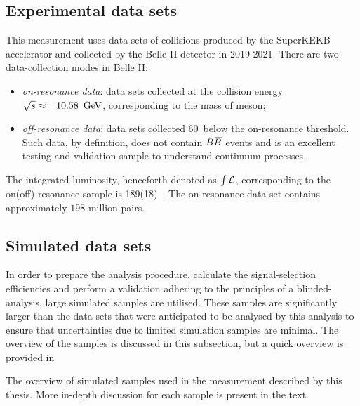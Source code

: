 
\subsection{Experimental data sets}\label{sec:data}

This measurement uses data sets of \epem collisions produced by the SuperKEKB accelerator and collected by the Belle II detector in 2019-2021.
There are two data-collection modes in Belle II:
\begin{itemize}
    \item \textit{on-resonance data}: data sets collected at the collision energy $\sqrt{s}\approx=10.58~\mathrm{\,Ge\kern -0.1em V}$, corresponding to the mass of \FourS meson;
    \item \textit{off-resonance data}: data sets collected 60~\mev below the on-resonance threshold. 
    Such data, by definition, does not contain $B\kern 0.18em\overline{\kern -0.18em B}{}$ events and is an excellent testing and validation sample to understand continuum processes.
\end{itemize}
The integrated luminosity, henceforth denoted as $\int~\hspace{-7pt}~\mathcal{L}$, corresponding to the on(off)-resonance sample is 189(18)~\invfb.
The on-resonance data set contains approximately $198$ million \BB pairs.

\subsection{Simulated data sets}\label{sec:MC}

In order to prepare the analysis procedure, calculate the signal-selection efficiencies and perform a validation adhering to the principles of a blinded-analysis, 
large simulated samples are utilised.
These samples are significantly larger than the data sets that were anticipated to be analysed by this analysis to ensure that uncertainties due to limited simulation samples are minimal.
The overview of the samples is discussed in this subsection, but a quick overview is provided in 

\begin{table}[htbp!]
    \centering
\caption{\label{tab:simulated_samples}The overview of simulated samples used in the measurement described by this thesis.
More in-depth discussion for each sample is present in the text.}

\end{table}

